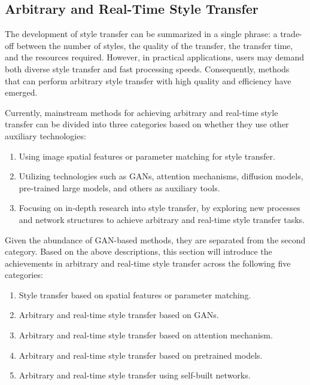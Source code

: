 \subsection{Arbitrary and Real-Time Style Transfer}

The development of style transfer can be summarized in a single phrase: a trade-off between the number of styles, the quality of the transfer, the transfer time, and the resources required. However, in practical applications, users may demand both diverse style transfer and fast processing speeds. Consequently, methods that can perform arbitrary style transfer with high quality and efficiency have emerged.

Currently, mainstream methods for achieving arbitrary and real-time style transfer can be divided into three categories based on whether they use other auxiliary technologies:
\begin{enumerate}
    \item Using image spatial features or parameter matching for style transfer.
    \item Utilizing technologies such as GANs\citep{38goodfellow2014generative}, attention mechanisms, diffusion models, pre-trained large models, and others as auxiliary tools.
    \item Focusing on in-depth research into style transfer, by exploring new processes and network structures to achieve arbitrary and real-time style transfer tasks.
\end{enumerate}

Given the abundance of GAN-based methods, they are separated from the second category. Based on the above descriptions, this section will introduce the achievements in arbitrary and real-time style transfer across the following five categories:

\begin{enumerate}
    \item Style transfer based on spatial features or parameter matching.
    \item Arbitrary and real-time style transfer based on GANs\citep{38goodfellow2014generative}.
    \item Arbitrary and real-time style transfer based on attention mechanism.
    \item Arbitrary and real-time style transfer based on pretrained models.
    \item Arbitrary and real-time style transfer using self-built networks.
\end{enumerate}

